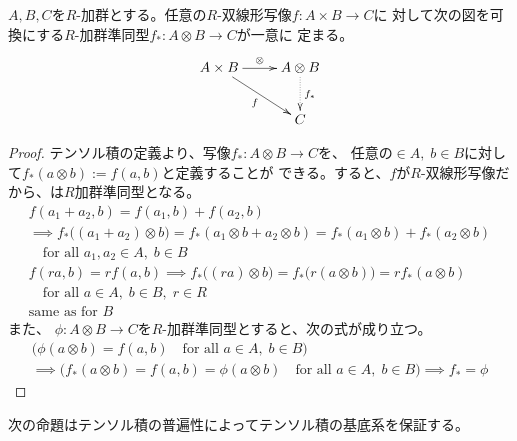 {	\begin{proposition}[テンソル積の普遍性]\label{prop:テンソル積の普遍性} %
		$A,B,C$を$R$-加群とする。任意の$R$-双線形写像$f:A\times B\to C$に
		対して次の図を可換にする$R$-加群準同型$f_*:A\otimes B\to C$が一意に
		定まる。
		\begin{equation*}\xymatrix{
			A\times B \ar[r]^{\otimes} \ar[dr]_f & A\otimes B \ar@{.>}[d]^{f_*} \\
			& C
		}\end{equation*}
	\end{proposition} %
	\begin{proof} テンソル積の定義より、写像$f_*:A\otimes B\to C$を、
		任意の$\in A,\;b\in B$に対して$f_*(a\otimes b):=f(a,b)$と定義することが
		できる。すると、$f$が$R$-双線形写像だから、は$R$加群準同型となる。
		\begin{equation*}\begin{split}
			f(a_1+a_2,b) = f(a_1,b) + f(a_2,b) \\
			\implies f_*\bigl((a_1 + a_2)\otimes b\bigr)
			=  f_*(a_1\otimes b + a_2\otimes b)
			= f_*(a_1\otimes b) + f_*(a_2\otimes b) \\
			\quad\text{for all } a_1,a_2\in A,\; b\in B \\
			f(ra,b) = rf(a,b) 
			\implies f_*\bigl((ra)\otimes b\bigr) 
			= f_*\bigl(r(a\otimes b)\bigr) = rf_*(a\otimes b) \\
			\quad\text{for all } a\in A,\; b\in B,\; r\in R \\
			\text{same as for $B$}
		\end{split}\end{equation*}
		また、
		$\phi:A\otimes B\to C$を$R$-加群準同型とすると、次の式が成り立つ。
		\begin{equation*}\begin{split}
			\biggl(\phi(a\otimes b) = f(a,b)
				\quad\text{for all }a\in A,\; b\in B \biggr) \\
			\implies \biggl( f_*(a\otimes b) = f(a,b) = \phi(a\otimes b)
				\quad\text{for all }a\in A,\; b\in B \biggr) \implies f_* = \phi
		\end{split}\end{equation*}
	\end{proof}

	次の命題はテンソル積の普遍性によってテンソル積の基底系を保証する。

}
